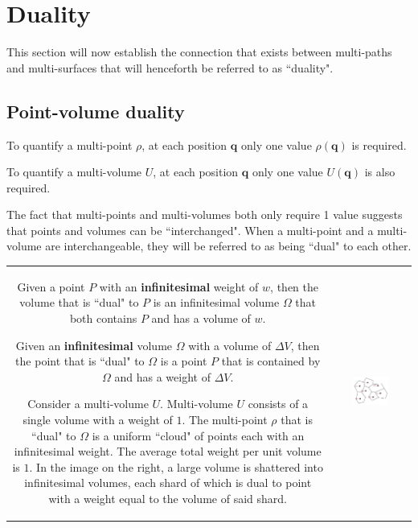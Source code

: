 


\chapter{Duality}\label{chap:duality}

This section will now establish the connection that exists between multi-paths and multi-surfaces that will henceforth be referred to as ``duality".


\section{Point-volume duality}

To quantify a multi-point \(\rho\), at each position \(\mathbf{q}\) only one value \(\rho(\mathbf{q})\) is required. 

To quantify a multi-volume \(U\), at each position \(\mathbf{q}\) only one value \(U(\mathbf{q})\) is also required. 

The fact that multi-points and multi-volumes both only require 1 value suggests that points and volumes can be ``interchanged". When a multi-point and a multi-volume are interchangeable, they will be referred to as being ``dual" to each other.

\begin{tabular}{cc}
\parbox{0.5\textwidth}{
Given a point \(P\) with an {\bf infinitesimal} weight of \(w\), then the volume that is ``dual" to \(P\) is an infinitesimal volume \(\Omega\) that both contains \(P\) and has a volume of \(w\). 

Given an {\bf infinitesimal} volume \(\Omega\) with a volume of \(\Delta V\), then the point that is ``dual" to \(\Omega\) is a point \(P\) that is contained by \(\Omega\) and has a weight of \(\Delta V\).

Consider a multi-volume \(U\). Multi-volume \(U\) consists of a single volume with a weight of \(1\). The multi-point \(\rho\) that is ``dual" to \(\Omega\) is a uniform ``cloud" of points each with an infinitesimal weight. The average total weight per unit volume is \(1\). In the image on the right, a large volume is shattered into infinitesimal volumes, each shard of which is dual to point with a weight equal to the volume of said shard. 
} & \parbox{0.5\textwidth}{
\includegraphics[width = 0.5\textwidth]{Duality/point_volume_duality}
}
\end{tabular}

